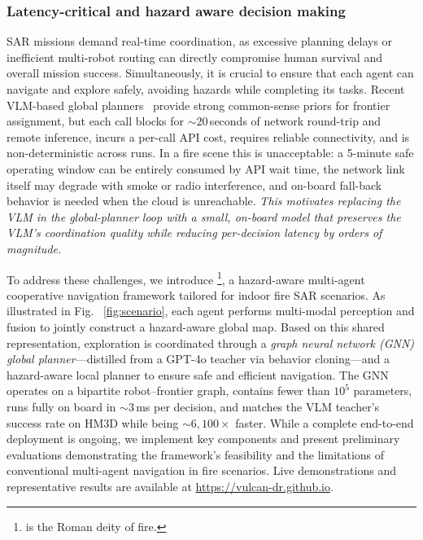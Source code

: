 \subsubsection{Latency-critical and hazard aware decision making} 
SAR missions demand real-time coordination, as excessive planning delays or inefficient multi-robot routing can directly compromise human survival and overall mission success. Simultaneously, it is crucial to ensure that each agent can navigate and explore safely, avoiding hazards while completing its tasks. Recent VLM-based global planners~\cite{11302789} provide strong common-sense priors for frontier assignment, but each call blocks for ${\sim}20$\,seconds of network round-trip and remote inference, incurs a per-call API cost, requires reliable connectivity, and is non-deterministic across runs. In a fire scene this is unacceptable: a 5-minute safe operating window can be entirely consumed by API wait time, the network link itself may degrade with smoke or radio interference, and on-board fall-back behavior is needed when the cloud is unreachable. \emph{This motivates replacing the VLM in the global-planner loop with a small, on-board model that preserves the VLM's coordination quality while reducing per-decision latency by orders of magnitude.}

To address these challenges, we introduce \textbf{\system}\footnote{\system is the Roman deity of fire.}, a hazard-aware multi-agent cooperative navigation framework tailored for indoor fire SAR scenarios. As illustrated in Fig. ~\ref{fig:scenario}, each agent performs multi-modal perception and fusion to jointly construct a hazard-aware global map. Based on this shared representation, exploration is coordinated through a \emph{graph neural network (GNN) global planner}---distilled from a GPT-4o teacher via behavior cloning---and a hazard-aware local planner to ensure safe and efficient navigation. The GNN operates on a bipartite robot--frontier graph, contains fewer than $10^5$ parameters, runs fully on board in ${\sim}3$\,ms per decision, and matches the VLM teacher's success rate on HM3D while being ${\sim}6{,}100\times$ faster. While a complete end-to-end deployment is ongoing, we implement key components and present preliminary evaluations demonstrating the framework’s feasibility and the limitations of conventional multi-agent navigation in fire scenarios. Live demonstrations and representative results are available at \url{https://vulcan-dr.github.io}.


